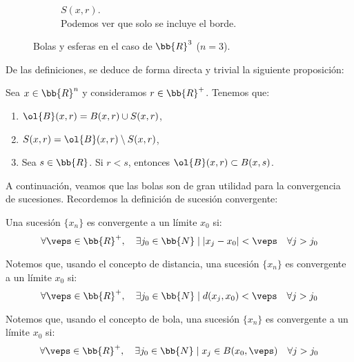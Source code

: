 \begin{ejemplo}
\begin{enumerate}
\begin{samepage}
\begin{figure}[H]
\begin{subfigure}[b]{0.3\textwidth}
                \caption{$S(x,r)$. \\{\centering Podemos ver que solo se incluye el borde.}}
            \end{subfigure}
            \caption{Bolas y esferas en el caso de $\bb{R}^3$ ($n=3$).}
        \end{figure}
        \end{samepage}
    \end{enumerate}
\end{ejemplo}


De las definiciones, se deduce de forma directa y trivial la siguiente proposición:
\begin{prop}
    Sea $x\in \bb{R}^n$ y consideramos $r\in \bb{R}^+$. Tenemos que:
    \begin{enumerate}
        \item $\ol{B}(x,r)=B(x,r)\cup S(x,r)$,
        \item $S(x,r)=\ol{B}(x,r)\setminus S(x,r)$,
        \item Sea $s\in \bb{R}$. Si $r<s$, entonces $\ol{B}(x,r)\subset B(x,s)$.
    \end{enumerate}
\end{prop}

A continuación, veamos que las bolas son de gran utilidad para la convergencia de sucesiones. Recordemos la definición de sucesión convergente:
\begin{definicion}
    Una sucesión $\{x_n\}$ es convergente a un límite $x_0$ si:
    \begin{equation*}
        \forall \veps\in \bb{R}^+,\quad \exists j_0\in \bb{N}\mid |x_j-x_0|<\veps \quad \forall j>j_0 
    \end{equation*}
\end{definicion}

\begin{observacion}
    Notemos que, usando el concepto de distancia, una sucesión $\{x_n\}$ es convergente a un límite $x_0$ si:
    \begin{equation*}
        \forall \veps\in \bb{R}^+,\quad \exists j_0\in \bb{N}\mid d(x_j,x_0)<\veps \quad \forall j>j_0 
    \end{equation*}

    Notemos que, usando el concepto de bola, una sucesión $\{x_n\}$ es convergente a un límite $x_0$ si:
        \begin{equation*}
            \forall \veps\in \bb{R}^+,\quad \exists j_0\in \bb{N}\mid x_j\in B(x_0,\veps) \quad \forall j>j_0 
        \end{equation*}
\end{observacion}


